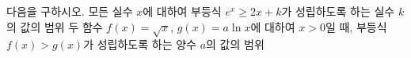다음을 구하시오.
 모든 실수 $x$에 대하여 부등식 $e^x\ge 2x+k$가 성립하도록 하는 실수 $k$의 값의 범위
 두 함수 $f(x)=\sqrt{x}$, $g(x)=a\ln x$에 대하여 $x>0$일 때, 부등식 $f(x)>g(x)$가 성립하도록 하는 양수 $a$의 값의 범위
